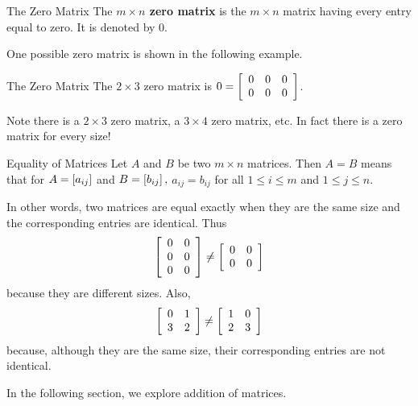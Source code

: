 \begin{definition}{The Zero Matrix}\label{def:zeromatrix}
The \textbf{$m\times n$ zero matrix} is the $m\times n$ matrix
having every entry equal to zero. It is
 denoted by $0.$
\end{definition}

One possible zero matrix is shown in the following example.

\begin{example}{The Zero Matrix}\label{exa:zeromatrix}
The $2\times 3$ zero matrix is $0= \left[
\begin{array}{ccc}
0 & 0 & 0 \\
0 & 0 & 0
\end{array}
\right] $.
\end{example}

Note there is a $2\times 3$ zero matrix, a $3\times 4$ zero matrix, etc. In
fact there is a zero matrix for every size! 

\begin{definition}{Equality of Matrices}\label{def:equalityofmatrices}
 Let $A$ and $B$ be two $m \times n$ matrices. Then $A=B$  means
that for $A=\left[ a_{ij}\right] $
and $B=\left[ b_{ij}\right] ,$ $a_{ij}=b_{ij}$ for all $1\leq i\leq m$ and 
$1\leq j\leq n.$
\end{definition}

In other words, two matrices are equal exactly when they are the same size and the
corresponding entries are identical. Thus
\begin{equation*}
\left[
\begin{array}{rr}
0 & 0 \\
0 & 0 \\
0 & 0
\end{array}
\right] \neq \left[
\begin{array}{rr}
0 & 0 \\
0 & 0
\end{array}
\right]
\end{equation*}
because they are different sizes. 
Also,
\begin{equation*}
\left[
\begin{array}{rr}
0 & 1 \\
3 & 2 
\end{array}
\right] \neq \left[
\begin{array}{rr}
1 & 0 \\
2 & 3
\end{array}
\right]
\end{equation*}
because, although they are the same size, their corresponding entries are not identical.

In the following section, we explore addition of matrices. 